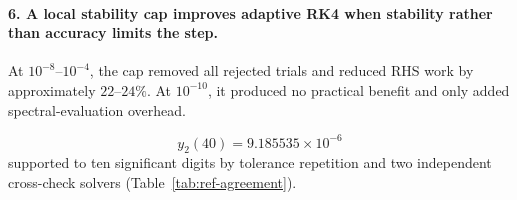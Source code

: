 \paragraph{6. A local stability cap improves adaptive RK4 when stability rather than accuracy limits the step.} At $10^{-8}$--$10^{-4}$, the cap removed all rejected trials and reduced RHS work by approximately $22$--$24\%$. At $10^{-10}$, it produced no practical benefit and only added spectral-evaluation overhead.

\[
\boxed{y_2(40)=9.185535\times10^{-6}}
\]
supported to ten significant digits by tolerance repetition and two independent cross-check solvers (Table~\ref{tab:ref-agreement}).
